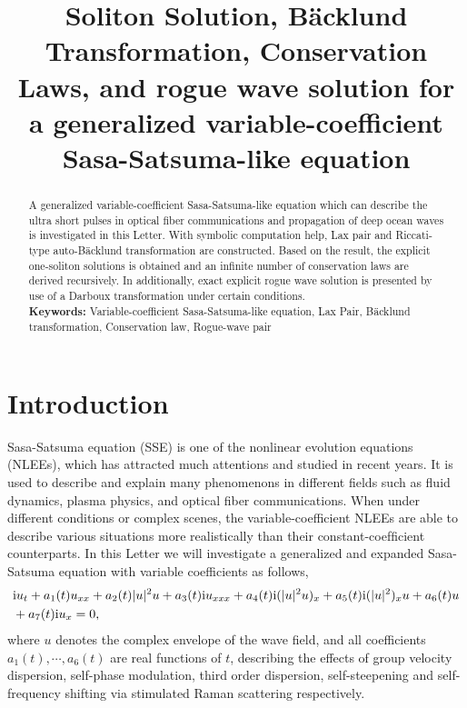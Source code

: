 \documentclass[12pt]{article}
\title{\large\bfseries Soliton Solution, B\"acklund Transformation, Conservation Laws, and rogue wave solution for a generalized variable-coefficient Sasa-Satsuma-like equation}
\author{}
\begin{document}
\maketitle

\begin{abstract}
A generalized variable-coefficient Sasa-Satsuma-like equation which can describe the ultra short pulses in optical fiber communications and propagation of deep ocean waves is investigated in this Letter. With symbolic computation help, Lax pair and Riccati-type auto-B\"acklund transformation are constructed. Based on the result, the explicit one-soliton solutions is obtained and an infinite number of conservation laws are derived recursively. In additionally, exact explicit rogue wave solution is presented by use of a Darboux transformation under certain conditions. \\
\indent\textbf{Keywords:} Variable-coefficient Sasa-Satsuma-like equation, Lax Pair, B\"acklund transformation, Conservation law, Rogue-wave pair
\end{abstract}

\section{Introduction}
Sasa-Satsuma equation (SSE) is one of the nonlinear evolution equations (NLEEs), which has attracted much attentions and studied in recent years. It is used to describe and explain many phenomenons in different fields such as fluid dynamics, plasma physics, and optical fiber communications. When under different conditions or complex scenes, the variable-coefficient NLEEs are able to describe various situations more realistically than their constant-coefﬁcient counterparts. In this Letter we will investigate a generalized and expanded Sasa-Satsuma equation with variable coefficients as follows,
\begin{align}
  & \mathrm{i}u_{t} + a_{1}(t)u_{xx} + a_2(t)|u|^{2}u + a_3(t)\mathrm{i}u_{xxx} + a_{4}(t)\mathrm{i}(|u|^{2}u)_{x} + a_{5}(t)\mathrm{i}(|u|^{2})_{x}u + a_{6}(t)u \notag\\
  & + a_{7}(t)\mathrm{i}u_{x}=0,
\end{align}
where $u$ denotes the complex envelope of the wave field, and all coefficients $a_{1}(t), \cdots, a_{6}(t)$ are real functions of $t$, describing the effects of group velocity dispersion, self-phase modulation, third order dispersion, self-steepening and self-frequency shifting via stimulated Raman scattering respectively.
\end{document}
